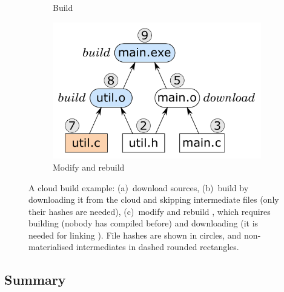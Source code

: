 \begin{figure}
\begin{subfigure}[b]{0.40\linewidth}
\vspace{-0.5mm}
\caption{Build }
\end{subfigure}
\begin{subfigure}[b]{0.31\linewidth}
\centerline{\includegraphics[scale=0.28]{fig/bazel-example-rebuild.pdf}}
\vspace{-0.5mm}
\caption{Modify  and rebuild}
\end{subfigure}
\vspace{-1mm}
\caption{A cloud build example: (a)~download sources, (b)~build 
by downloading it from the cloud and skipping intermediate files (only their
hashes are needed), (c)~modify  and rebuild , which
requires building  (nobody has compiled  before) and
downloading  (it is needed for linking ). File hashes
are shown in circles, and non-materialised intermediates in dashed rounded
rectangles.\label{fig-bazel}}
\vspace{-1mm}
\end{figure}

\vspace{-1.5mm}
\subsection{Summary}\label{sec-background-summary}
\vspace{-0.5mm}

